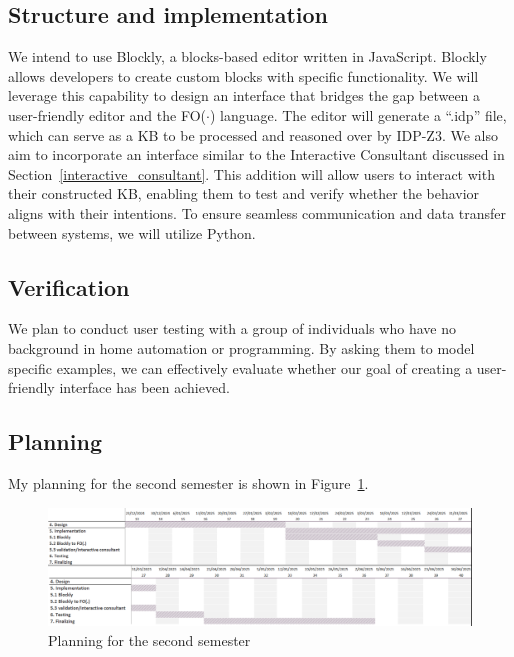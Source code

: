 \documentclass[11pt,a4paper]{report}
\newcommand{\fodot}{FO($\cdot$)\xspace}
\begin{document}
\subsection{Structure and implementation}
We intend to use Blockly, a blocks-based editor written in JavaScript. Blockly allows developers to create custom blocks with specific functionality. We will leverage this capability to design an interface that bridges the gap between a user-friendly editor and the \fodot language. The editor will generate a ``.idp'' file, which can serve as a KB to be processed and reasoned over by IDP-Z3. We also aim to incorporate an interface similar to the Interactive Consultant discussed in Section~\ref{interactive_consultant}. This addition will allow users to interact with their constructed KB, enabling them to test and verify whether the behavior aligns with their intentions. To ensure seamless communication and data transfer between systems, we will utilize Python. 

\subsection{Verification}
We plan to conduct user testing with a group of individuals who have no background in home automation or programming. By asking them to model specific examples, we can effectively evaluate whether our goal of creating a user-friendly interface has been achieved.

\subsection{Planning}
My planning for the second semester is shown in Figure~\ref{fig:planning}.
\begin{figure}
    \centering
    \includegraphics[angle=90, width=0.4\linewidth]{images/planning.png}
    \caption{Planning for the second semester}
    \label{fig:planning}
\end{figure}
\printbibliography
\end{document}
